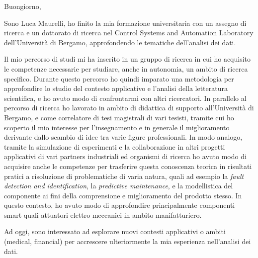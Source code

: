 \documentclass[10pt]{article}
\begin{document}




Buongiorno,

Sono Luca Maurelli, ho finito la mia formazione universitaria con un assegno di ricerca e un dottorato di ricerca nel Control Systems and Automation Laboratory dell'Università di Bergamo, approfondendo le tematiche dell'analisi dei dati.

Il mio percorso di studi mi ha inserito in un gruppo di ricerca in cui ho acquisito le competenze necessarie per studiare, anche in autonomia, un ambito di ricerca specifico.
Durante questo percorso ho quindi imparato una metodologia per approfondire lo studio del contesto applicativo e l'analisi della letteratura scientifica, e ho avuto modo di confrontarmi con altri ricercatori.
In parallelo al percorso di ricerca ho lavorato in ambito di didattica di supporto all'Università di Bergamo, e come correlatore di tesi magistrali di vari tesisti, tramite cui ho scoperto il mio interesse per l'insegnamento e in generale il miglioramento derivante dallo scambio di idee tra varie figure professionali.
In modo analogo, tramite la simulazione di esperimenti e la collaborazione in altri progetti applicativi di vari partners industriali ed organismi di ricerca ho avuto modo di acquisire anche le competenze per trasferire questa conoscenza teorica in risultati pratici a risoluzione di problematiche di varia natura, quali ad esempio la \textit{fault detection and identification}, la \textit{predictive maintenance}, e la modellistica del componente ai fini della comprensione e miglioramento del prodotto stesso.
In questo contesto, ho avuto modo di approfondire principalmente componenti smart quali attuatori elettro-meccanici in ambito manifatturiero.

Ad oggi, sono interessato ad esplorare nuovi contesti applicativi o ambiti (medical, financial) per accrescere ulteriormente la mia esperienza nell'analisi dei dati.
\end{document}
